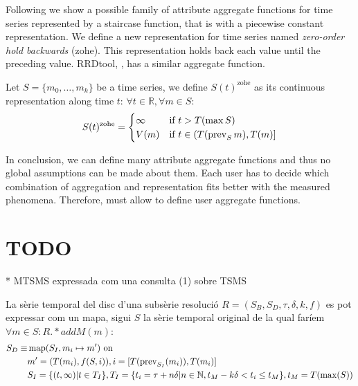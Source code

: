 Following we show a possible family of attribute aggregate functions
for time series represented by a staircase function, that is with a
piecewise constant representation.  We define a new representation for
time series named \emph{zero-order hold backwards} (zohe). This
representation holds back each value until the preceding value. 
RRDtool, \cite{lisa98:oetiker}, has a similar aggregate function.

Let $S=\{m_0,\ldots,m_k\}$ be a time series, we define
$S(t)^{\text{zohe}}$ as its continuous representation along time $t$:
$\forall t \in \mathbb{R} ,\forall m \in S:$
\begin{equation}
 S(t)^{\text{zohe}} =  
\begin{cases}
  \infty & \text{if } t > T(\max S) \\
  V(m)   & \text{if } t\in (T(\operatorname*{prev}_S m),T(m)]
\end{cases}
\label{eq:zohe}
\end{equation}


In conclusion, we can define many attribute aggregate functions and
thus no global assumptions can be made about them. Each user has to
decide which combination of aggregation and representation fits better
with the measured phenomena.  Therefore,  must allow to
define user aggregate functions.










\todo{}


\section{TODO}


* MTSMS expressada com una consulta (1) sobre TSMS

La sèrie temporal del disc d'una subsèrie resolució $R=(S_B,S_D,\tau,\delta,k,f)$ es pot expressar com un mapa, sigui $S$ la sèrie temporal original de la qual faríem $\forall m \in S: R.*addM(m)$: 
  \begin{align*}
    S_D \equiv &  \operatorname{map}(S_I, m_i\mapsto m') \text{ on }  \\
    & m' = (T(m_i), f(S, i)), i = [T(\operatorname{prev}_{S_I}(m_i)),T(m_i)] \\
    &  S_I = \{ (t,\infty) | t\in T_I  \}, T_I = \{ t_i = \tau+n\delta | n\in\mathbb{N}, t_M - k\delta < t_i \leq t_M \}, t_M = T(\max(S))
  \end{align*}
  

